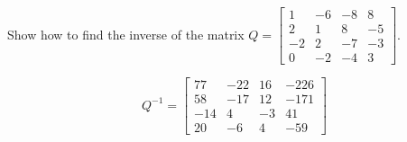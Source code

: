 
\begin{exerciseStatement}


Show how to find the inverse of the matrix \(Q= \left[\begin{array}{cccc}
1 & -6 & -8 & 8 \\
2 & 1 & 8 & -5 \\
-2 & 2 & -7 & -3 \\
0 & -2 & -4 & 3
\end{array}\right] \).


\end{exerciseStatement}
    
\begin{exerciseAnswer} 
\[Q^{-1}= \left[\begin{array}{cccc}
77 & -22 & 16 & -226 \\
58 & -17 & 12 & -171 \\
-14 & 4 & -3 & 41 \\
20 & -6 & 4 & -59
\end{array}\right] \]
\end{exerciseAnswer}
    
